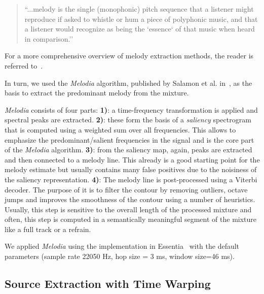\begin{quote}
  ``...melody is the single (monophonic) pitch sequence that a listener might reproduce if asked to whistle or hum a piece of polyphonic music, and that a listener would recognize as being the `essence` of that music when heard in comparison.''
\end{quote}

For a more comprehensive overview of melody extraction methods, the reader is referred to~\cite{salamon14}.

In turn, we used the \emph{Melodia} algorithm, published by Salamon et al. in~\cite{salamon12}, as the basis to extract the predominant melody from the mixture.\par

\emph{Melodia} consists of four parts:
\noindent\textbf{1)}: a time-frequency transformation is applied and spectral peaks are extracted.
\textbf{2)}: these form the basis of a \emph{saliency} spectrogram that is computed using a weighted sum over all frequencies. This allows to emphasize the predominant/salient frequencies in the signal and is the core part of the \emph{Melodia} algorithm.
\textbf{3)}: from the saliency map, again, peaks are extracted and then connected to a melody line. This already is a good starting point for the melody estimate but usually contains many false positives due to the noisiness of the saliency representation.
\textbf{4)}: The melody line is post-processed using a Viterbi decoder.
The purpose of it is to filter the contour by removing outliers, octave jumps and improves the smoothness of the contour using a number of heuristics.
Usually, this step is sensitive to the overall length of the processed mixture and often, this step is computed in a semantically meaningful segment of the mixture like a full track or a refrain.
\par
We applied \emph{Melodia} using the implementation in Essentia~\cite{bogdanov13} with the default parameters (sample rate 22050 Hz, hop size = 3 ms, window size=46 ms).

\subsection{Source Extraction with Time Warping}


